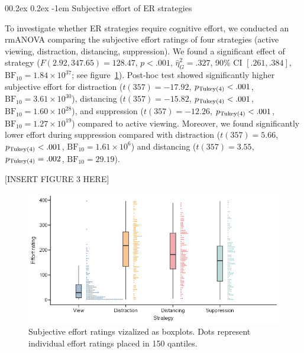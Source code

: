 \documentclass[
  man,floatsintext]{apa6}
\makeatletter
\let\oldparagraph\paragraph
\renewcommand{\paragraph}[1]{\oldparagraph{#1}\mbox{}}
\renewcommand{\paragraph}{\@startsection{paragraph}{4}{\parindent}%
  {0\baselineskip \@plus 0.2ex \@minus 0.2ex}%
  {-1em}%
  {\normalfont\normalsize\bfseries\itshape\typesectitle}}
\makeatother
\begin{document}
\hypertarget{subjective-effort-of-er-strategies}{%
\paragraph{Subjective effort of ER strategies}\label{subjective-effort-of-er-strategies}}

To investigate whether ER strategies require cognitive effort, we conducted an rmANOVA comparing the subjective effort ratings of four strategies (active viewing, distraction, distancing, suppression).
We found a significant effect of strategy (\(F(2.92, 347.65) = 128.47\), \(p < .001\), \(\hat{\eta}^2_G = .327\), 90\% CI \([.261, .384]\), \(\mathrm{BF}_{\textrm{10}} = 1.84 \times 10^{37}\); see figure~\ref{fig:FigSubjEffort}).
Post-hoc test showed significantly higher subjective effort for distraction (\(t(357) = -17.92\), \(p_\mathrm{\scriptsize Tukey(4)} < .001\), \(\mathrm{BF}_{\textrm{10}} = 3.61 \times 10^{30}\)), distancing (\(t(357) = -15.82\), \(p_\mathrm{\scriptsize Tukey(4)} < .001\), \(\mathrm{BF}_{\textrm{10}} = 1.60 \times 10^{28}\)), and suppression (\(t(357) = -12.26\), \(p_\mathrm{\scriptsize Tukey(4)} < .001\), \(\mathrm{BF}_{\textrm{10}} = 1.27 \times 10^{19}\)) compared to active viewing.
Moreover, we found significantly lower effort during suppression compared with distraction (\(t(357) = 5.66\), \(p_\mathrm{\scriptsize Tukey(4)} < .001\), \(\mathrm{BF}_{\textrm{10}} = 1.61 \times 10^{6}\)) and distancing (\(t(357) = 3.55\), \(p_\mathrm{\scriptsize Tukey(4)} = .002\), \(\mathrm{BF}_{\textrm{10}} = 29.19\)).

{[}INSERT FIGURE 3 HERE{]}

\begin{figure}[H]
\includegraphics[width=\textwidth]{figures/FigSubjEffort} \caption{Subjective effort ratings vizalized as boxplots. Dots represent individual effort ratings placed in 150 qantiles.}\label{fig:FigSubjEffort}
\end{figure}
\end{document}
